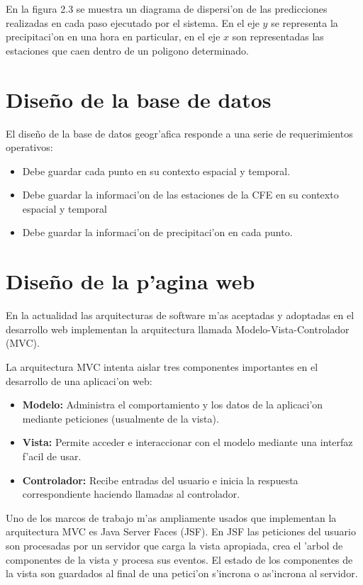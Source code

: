 En la figura 2.3 se muestra un diagrama de dispersi'on de las predicciones realizadas en cada paso ejecutado por el sistema.
En el eje ${y}$ se representa la precipitaci'on en una hora en particular, 
en el eje $x$ son representadas las estaciones que caen dentro de un poligono
determinado. 




\section{Dise\~no de la base de datos}

El dise\~no de la base de datos geogr'afica responde a una serie de requerimientos operativos:
\begin{itemize}
 \item Debe guardar cada punto en su contexto espacial y temporal.
 \item Debe guardar la informaci'on de las estaciones de la CFE en su contexto espacial y temporal
 \item Debe guardar la informaci'on de precipitaci'on en cada punto.
\end{itemize}


\section{Dise\~no de la p'agina web}
En la actualidad las arquitecturas de software m'as aceptadas y adoptadas en 
el desarrollo web implementan la arquitectura llamada Modelo-Vista-Controlador (MVC).

La arquitectura MVC intenta aislar tres componentes importantes en el desarrollo
de una aplicaci'on web:

\begin{itemize}
 \item \textbf{Modelo:} Administra el comportamiento y los datos de la aplicaci'on mediante peticiones (usualmente de la vista).
\item \textbf{Vista:} Permite acceder e interaccionar con el modelo mediante una interfaz f'acil de usar.
\item \textbf{Controlador: } Recibe entradas del usuario e inicia la respuesta correspondiente haciendo llamadas al controlador.
\end{itemize}

Uno de los marcos de trabajo m'as ampliamente usados que implementan la arquitectura MVC es Java Server Faces (JSF). En JSF las
peticiones del usuario son procesadas por un servidor que carga la vista apropiada, crea el 'arbol de componentes de la vista y
procesa sus eventos. El estado de los componentes de la vista son guardados al final de una petici'on s'incrona o as'incrona al servidor.

